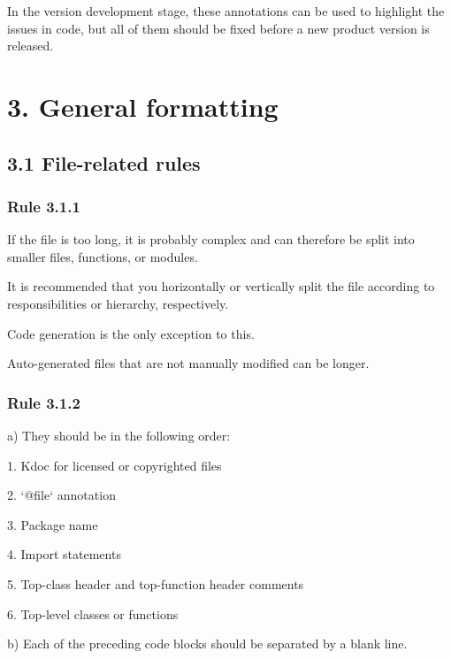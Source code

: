 In the version development stage, these annotations can be used to highlight the issues in code, but all of them should be fixed before a new product version is released.

\section*{\textbf{3. General formatting}}

\subsection*{\textbf{3.1 File-related rules}}

\subsubsection*{\textbf{Rule 3.1.1}}
\leavevmode\newline



If the file is too long, it is probably complex and can therefore be split into smaller files, functions, or modules.

It is recommended that you horizontally or vertically split the file according to responsibilities or hierarchy, respectively.

Code generation is the only exception to this.

Auto-generated files that are not manually modified can be longer.



\subsubsection*{\textbf{Rule 3.1.2}}
\leavevmode\newline



a) They should be in the following order:

1.	Kdoc for licensed or copyrighted files

2.	`@file` annotation

3.	Package name

4.	Import statements

5.	Top-class header and top-function header comments

6.	Top-level classes or functions



b) Each of the preceding code blocks should be separated by a blank line. 




